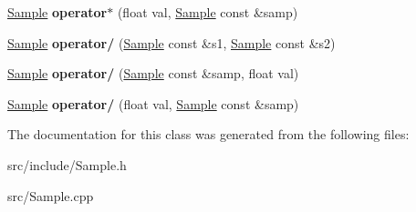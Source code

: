 \begin{DoxyCompactItemize}
\item 
\hypertarget{class_sample_afacc0c2623435bca02ee4049ed2db550}{\hyperlink{class_sample}{Sample} {\bfseries operator$\ast$} (float val, \hyperlink{class_sample}{Sample} const \&samp)}\label{class_sample_afacc0c2623435bca02ee4049ed2db550}

\item 
\hypertarget{class_sample_a26dc248966f0cb3c5d1c52f7aa6643d4}{\hyperlink{class_sample}{Sample} {\bfseries operator/} (\hyperlink{class_sample}{Sample} const \&s1, \hyperlink{class_sample}{Sample} const \&s2)}\label{class_sample_a26dc248966f0cb3c5d1c52f7aa6643d4}

\item 
\hypertarget{class_sample_a135d15a9237414aabce1df8f3a5ae77f}{\hyperlink{class_sample}{Sample} {\bfseries operator/} (\hyperlink{class_sample}{Sample} const \&samp, float val)}\label{class_sample_a135d15a9237414aabce1df8f3a5ae77f}

\item 
\hypertarget{class_sample_a6178925f7213e13df7f4106cc0e22330}{\hyperlink{class_sample}{Sample} {\bfseries operator/} (float val, \hyperlink{class_sample}{Sample} const \&samp)}\label{class_sample_a6178925f7213e13df7f4106cc0e22330}

\end{DoxyCompactItemize}


The documentation for this class was generated from the following files\+:\begin{DoxyCompactItemize}
\item 
src/include/Sample.\+h\item 
src/Sample.\+cpp\end{DoxyCompactItemize}

